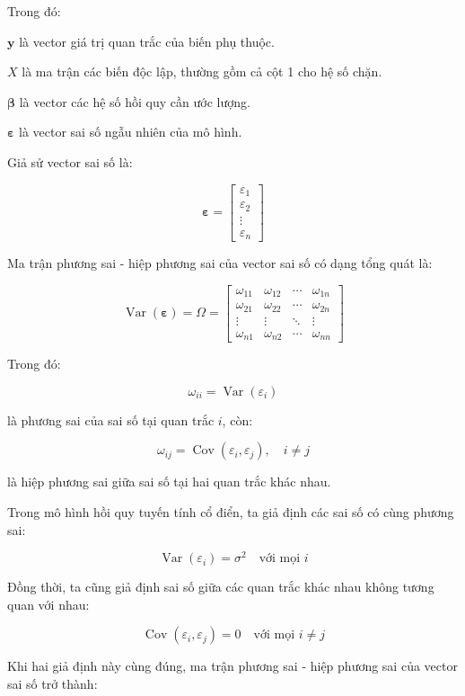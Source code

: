 \documentclass[12pt,a4paper]{article}
\begin{document}
Trong đó:

\(\mathbf{y}\) là vector giá trị quan trắc của biến phụ thuộc.

\(X\) là ma trận các biến độc lập, thường gồm cả cột 1 cho hệ số chặn.

\(\boldsymbol{\beta}\) là vector các hệ số hồi quy cần ước lượng.

\(\boldsymbol{\varepsilon}\) là vector sai số ngẫu nhiên của mô hình.

Giả sử vector sai số là:

\[
\boldsymbol{\varepsilon}
=
\begin{bmatrix}
\varepsilon_1 \\
\varepsilon_2 \\
\vdots \\
\varepsilon_n
\end{bmatrix}
\]

Ma trận phương sai - hiệp phương sai của vector sai số có dạng tổng quát là:

\[
\operatorname{Var}(\boldsymbol{\varepsilon})
=
\Omega
=
\begin{bmatrix}
\omega_{11} & \omega_{12} & \cdots & \omega_{1n} \\
\omega_{21} & \omega_{22} & \cdots & \omega_{2n} \\
\vdots & \vdots & \ddots & \vdots \\
\omega_{n1} & \omega_{n2} & \cdots & \omega_{nn}
\end{bmatrix}
\]

Trong đó:

\[
\omega_{ii}
=
\operatorname{Var}(\varepsilon_i)
\]

là phương sai của sai số tại quan trắc \(i\), còn:

\[
\omega_{ij}
=
\operatorname{Cov}(\varepsilon_i,\varepsilon_j),
\quad i \neq j
\]

là hiệp phương sai giữa sai số tại hai quan trắc khác nhau.

Trong mô hình hồi quy tuyến tính cổ điển, ta giả định các sai số có cùng phương sai:

\[
\operatorname{Var}(\varepsilon_i)=\sigma^2
\quad \text{với mọi } i
\]

Đồng thời, ta cũng giả định sai số giữa các quan trắc khác nhau không tương quan với nhau:

\[
\operatorname{Cov}(\varepsilon_i,\varepsilon_j)=0
\quad \text{với mọi } i \neq j
\]

Khi hai giả định này cùng đúng, ma trận phương sai - hiệp phương sai của vector sai số trở thành:
\end{document}
